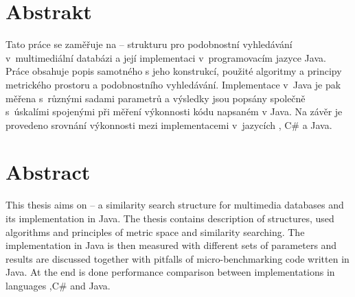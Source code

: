 \section*{Abstrakt}
Tato práce se zaměřuje na \MIndex{} -- strukturu pro podobnostní vyhledávání v~multimediální databázi a její implementaci v~programovacím jazyce Java.
Práce obsahuje popis samotného  s jeho konstrukcí, použité algoritmy a principy metrického prostoru a podobnostního vyhledávání.
Implementace v~Java je pak měřena s~různými sadami parametrů  a výsledky jsou popsány společně s~úskalími spojenými při měření výkonnosti kódu napsaném v Java.
Na závěr je provedeno srovnání výkonnosti mezi implementacemi  v~jazycích \CC, C\# a Java.

\section*{Abstract}
This thesis aims on \MIndex{} -- a similarity search structure for multimedia databases and its implementation in Java.
The thesis contains description of \MIndex{} structures, used algorithms and principles of metric space and similarity searching.
The implementation in Java is then measured with different sets of parameters and results are discussed together with pitfalls of micro-benchmarking code written in Java.
At the end is done performance comparison between \MIndex{} implementations in languages \CC,C\# and Java.
\newpage